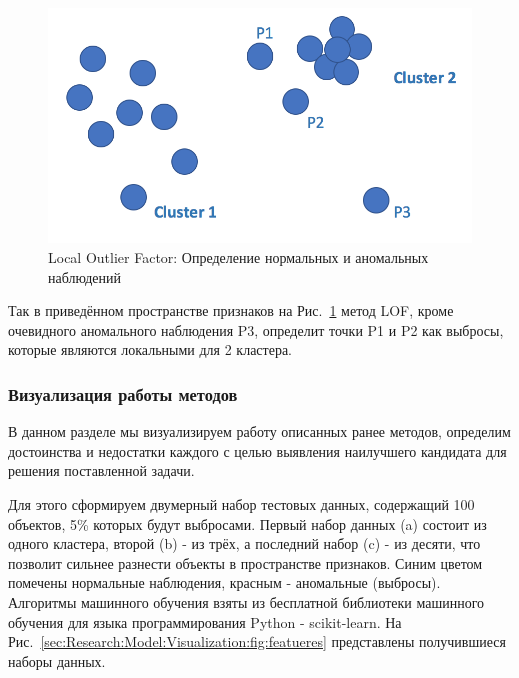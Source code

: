 \documentclass[12pt]{article}
\begin{document}
    \begin{figure}[h]
        \centering
        \includegraphics[width=\linewidth]{LocalOutlierFactor.png}
        \caption{Local Outlier Factor: Определение нормальных и аномальных наблюдений}
        \label{sec:Research:Model:LocalOutlierFactor:fig:LocalOutlierFactor}
    \end{figure}

    \par Так в приведённом пространстве признаков на Рис.~\ref{sec:Research:Model:LocalOutlierFactor:fig:LocalOutlierFactor} метод LOF, кроме очевидного аномального наблюдения P3, определит точки P1 и P2 как выбросы, которые являются локальными для 2 кластера.

    \newpage


    \subsubsection{Визуализация работы методов}
    \label{sec:Research:Model:Visualization}

    \par В данном разделе мы визуализируем работу описанных ранее методов, определим достоинства и недостатки каждого с целью выявления наилучшего кандидата для решения поставленной задачи. \\

    \par Для этого сформируем двумерный набор тестовых данных, содержащий 100 объектов, 5\% которых будут выбросами. Первый набор данных (a) состоит из одного кластера, второй (b) - из трёх, а последний набор (c) - из десяти, что позволит сильнее разнести объекты в пространстве признаков. Синим цветом помечены нормальные наблюдения, красным - аномальные (выбросы). Алгоритмы машинного обучения взяты из бесплатной библиотеки машинного обучения для языка программирования Python - scikit-learn. На Рис.~\ref{sec:Research:Model:Visualization:fig:featueres} представлены получившиеся наборы данных.
\end{document}
